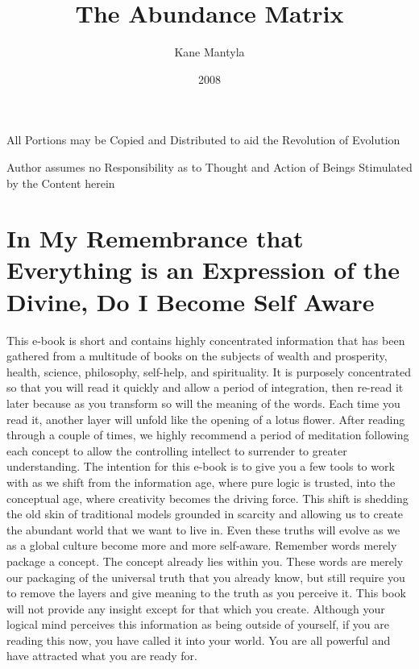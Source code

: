 \documentclass[12pt]{report}
\title{The Abundance Matrix}
\author{Kane Mantyla}
\date{2008}
\begin{document}
\maketitle


\tableofcontents
\listoffigures


\begin{center}

All Portions may be Copied and Distributed to aid the Revolution of
Evolution
\end{center}

\begin{center}
Author assumes no Responsibility as to Thought and Action of Beings
Stimulated by the Content herein
\end{center}



\section{In My Remembrance that Everything is an Expression of the
  Divine, Do I Become Self Aware} 

This e-book is short and contains highly concentrated information that
has been gathered from a multitude of books on the subjects of
wealth and prosperity, health, science, philosophy, self-help, and
spirituality. It is purposely concentrated so that you will read it quickly
and allow a period of integration, then re-read it later because as you
transform so will the meaning of the words. Each time you read it,
another layer will unfold like the opening of a lotus flower. After reading
through a couple of times, we highly recommend a period of
meditation following each concept to allow the controlling intellect to
surrender to greater understanding. The intention for this e-book is to
give you a few tools to work with as we shift from the information
age, where pure logic is trusted, into the conceptual age, where creativity
becomes the driving force. This shift is shedding the old skin of
traditional models grounded in scarcity and allowing us to create the
abundant world that we want to live in. Even these truths will evolve
as we as a global culture become more and more self-aware. Remember
words merely package a concept. The concept already lies within
you. These words are merely our packaging of the universal truth that
you already know, but still require you to remove the layers and give
meaning to the truth as you perceive it. This book will not provide any
insight except for that which you create. Although your logical mind
perceives this information as being outside of yourself, if you are
reading this now, you have called it into your world. You are all powerful
and have attracted what you are ready for.
\end{document}

